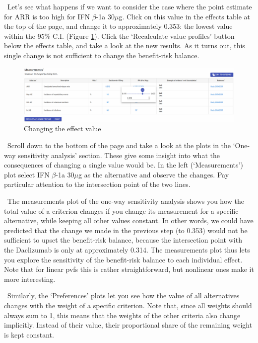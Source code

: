 \documentclass[00_mcda_tutorial.tex]{subfiles}
\begin{document}
\noindent \leftpointright \, Let’s see what happens if we want to consider the case where the point estimate for ARR is too high for IFN $\beta$-1a 30$\mu$g. Click on this value in the effects table at the top of the page, and change it to approximately 0.353: the lowest value within the 95\% C.I. (Figure \ref{fig:changeARR}). Click the ‘Recalculate value profiles’ button below the effects table, and take a look at the new results. As it turns out, this single change is not sufficient to change the benefit-risk balance.
\newline

\begin{figure}[!h]
    \centering
	\includegraphics[width=\textwidth]{fig/changeARR.png}
    \caption{Changing the effect value}
	\label{fig:changeARR}
\end{figure}

\noindent \leftpointright \, Scroll down to the bottom of the page and take a look at the plots in the ‘One-way sensitivity analysis’ section. These give some insight into what the consequences of changing a single value would be. In the left (‘Measurements’) plot select IFN $\beta$-1a 30$\mu$g as the alternative and observe the changes. Pay particular attention to the intersection point of the two lines.
\newline

\noindent \faGraduationCap \, The measurements plot of the one-way sensitivity analysis shows you how the total value of a criterion changes if you change its measurement for a specific alternative, while keeping all other values constant. In other words, we could have predicted that the change we made in the previous step (to 0.353) would not be sufficient to upset the benefit-risk balance, because the intersection point with the Daclizumab is only at approximately 0.314. The measurements plot thus lets you explore the sensitivity of the benefit-risk balance to each individual effect. Note that for linear pvfs this is rather straightforward, but nonlinear ones make it more interesting.
\newline

\noindent \faGraduationCap \, Similarly, the ‘Preferences’ plots let you see how the value of all alternatives changes with the weight of a specific criterion. Note that, since all weights should always sum to 1, this means that the weights of the other criteria also change implicitly. Instead of their value, their proportional share of the remaining weight is kept constant.
\newline
\end{document}
